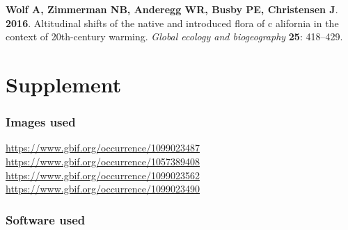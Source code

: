 \documentclass[man,floatsintext]{apa6}
\theoremstyle{definition}
\theoremstyle{definition}
\theoremstyle{definition}
\theoremstyle{remark}
\begin{document}
\leavevmode\hypertarget{ref-wolf2016altitudinal}{}%
\textbf{\textnormal{Wolf A}, \textnormal{Zimmerman NB},
\textnormal{Anderegg WR}, \textnormal{Busby PE}, \textnormal{Christensen
J}}. \textbf{2016}. Altitudinal shifts of the native and introduced
flora of c alifornia in the context of 20th-century warming.
\emph{Global ecology and biogeography} \textbf{25}: 418--429.

\endgroup

\newpage
\setcounter{table}{0}  \renewcommand{\thetable}{S\arabic{table}} \setcounter{figure}{0} \renewcommand{\thefigure}{S\arabic{figure}}

\hypertarget{supplement}{%
\section{Supplement}\label{supplement}}

\hypertarget{images-used}{%
\subsubsection{Images used}\label{images-used}}

\url{https://www.gbif.org/occurrence/1099023487}
\url{https://www.gbif.org/occurrence/1057389408}
\url{https://www.gbif.org/occurrence/1099023562}
\url{https://www.gbif.org/occurrence/1099023490}

\hypertarget{software-used}{%
\subsubsection{Software used}\label{software-used}}
\end{document}
